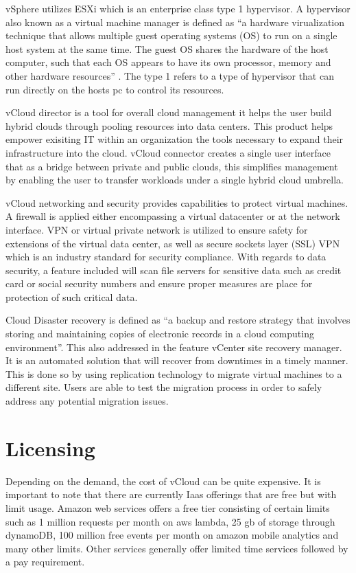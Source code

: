\documentclass[9pt,twocolumn,twoside]{../../styles/osajnl}
\begin{document}
vSphere utilizes ESXi which is an enterprise class type 1 hypervisor.  A
hypervisor also known as a virtual machine manager is defined as “a
hardware virualization technique that allows multiple guest operating
systems (OS) to run on a single host system at the same time.  The
guest OS shares the hardware of the host computer, such that each OS
appears to have its own processor, memory and other hardware
resources” \cite{www-technopedia}. The type 1 refers to a type of
hypervisor that can run directly on the hosts pc to control its
resources.

vCloud director is a tool for overall cloud management it
helps the user build hybrid clouds through pooling resources into data
centers.  This product helps empower exisiting IT within an
organization the tools necessary to expand their infrastructure into
the cloud. vCloud connector creates a single user interface that as a
bridge between private and public clouds, this simplifies management
by enabling the user to transfer workloads under a single hybrid cloud
umbrella.

vCloud networking and security provides capabilities to
protect virtual machines.  A firewall is applied either encompassing a
virtual datacenter or at the network interface.  VPN or virtual
private network is utilized to ensure safety for extensions of the
virtual data center, as well as secure sockets layer (SSL) VPN which
is an industry standard for security compliance\cite{www-vmware3}.
With regards to data security, a feature included will scan file
servers for sensitive data such as credit card or social security
numbers and ensure proper measures are place for protection of such
critical data.

Cloud Disaster recovery is defined as “a backup and
restore strategy that involves storing and maintaining copies of
electronic records in a cloud computing environment”\cite{www-cloud}.
This also addressed in the feature vCenter site recovery manager.  It
is an automated solution that will recover from downtimes in a timely
manner.  This is done so by using replication technology to migrate
virtual machines to a different site.  Users are able to test the
migration process in order to safely address any potential migration
issues.

\section{Licensing}

Depending on the demand, the cost of vCloud can be quite expensive.
It is important to note that there are currently Iaas offerings that
are free but with limit usage.  Amazon web services offers a free tier
consisting of certain limits such as 1 million requests per month on
aws lambda, 25 gb of storage through dynamoDB, 100 million free events
per month on amazon mobile analytics and many other
limits\cite{www-aws}. Other services generally offer limited time
services followed by a pay requirement.
\end{document}
